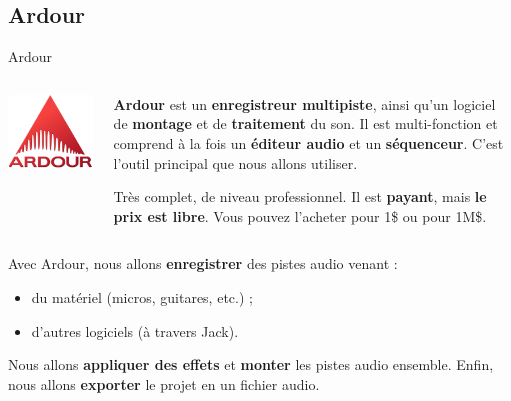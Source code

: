 \documentclass{beamer}
\begin{document}
\subsection{Ardour}
\begin{frame}{Ardour}
  \begin{columns}
  \begin{column}{0.15\textwidth}
    \includegraphics[width=\linewidth]{ardour_logo}
  \end{column}
  \begin{column}{0.85\textwidth}
    \textbf{Ardour} est un \textbf{enregistreur multipiste}, ainsi qu'un logiciel de \textbf{montage} et de \textbf{traitement} du son. Il est multi-fonction et comprend à la fois un \textbf{éditeur audio} et un \textbf{séquenceur}. C'est l'outil principal que nous allons utiliser.

    Très complet, de niveau professionnel.
    Il est \textbf{payant}, mais \textbf{le prix est libre}. Vous pouvez l'acheter pour 1\$ ou pour 1M\$.
  \end{column}
  \end{columns}
  \medskip
  
  Avec Ardour, nous allons \textbf{enregistrer} des pistes audio venant :
  \begin{itemize}
  \item du matériel (micros, guitares, etc.) ;
  \item d'autres logiciels (à travers Jack).
  \end{itemize}
  Nous allons \textbf{appliquer des effets} et \textbf{monter} les pistes audio ensemble. Enfin, nous allons \textbf{exporter} le projet en un fichier audio.
\end{frame}
\end{document}
